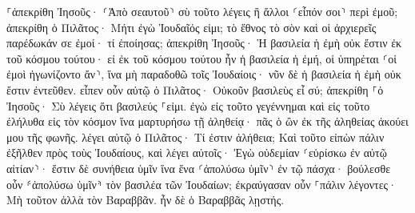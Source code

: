 \documentclass{openreader}
\begin{document}
⸀ἀπεκρίθη Ἰησοῦς· ⸂Ἀπὸ σεαυτοῦ⸃ σὺ τοῦτο λέγεις ἢ ἄλλοι ⸂εἶπόν σοι⸃ περὶ ἐμοῦ; 
ἀπεκρίθη ὁ Πιλᾶτος· Μήτι ἐγὼ Ἰουδαῖός εἰμι; τὸ ἔθνος τὸ σὸν καὶ οἱ ἀρχιερεῖς παρέδωκάν σε ἐμοί· τί ἐποίησας; 
ἀπεκρίθη Ἰησοῦς· Ἡ βασιλεία ἡ ἐμὴ οὐκ ἔστιν ἐκ τοῦ κόσμου τούτου· εἰ ἐκ τοῦ κόσμου τούτου ἦν ἡ βασιλεία ἡ ἐμή, οἱ ὑπηρέται ⸂οἱ ἐμοὶ ἠγωνίζοντο ἄν⸃, ἵνα μὴ παραδοθῶ τοῖς Ἰουδαίοις· νῦν δὲ ἡ βασιλεία ἡ ἐμὴ οὐκ ἔστιν ἐντεῦθεν. 
εἶπεν οὖν αὐτῷ ὁ Πιλᾶτος· Οὐκοῦν βασιλεὺς εἶ σύ; ἀπεκρίθη ⸀ὁ Ἰησοῦς· Σὺ λέγεις ὅτι βασιλεύς ⸀εἰμι. ἐγὼ εἰς τοῦτο γεγέννημαι καὶ εἰς τοῦτο ἐλήλυθα εἰς τὸν κόσμον ἵνα μαρτυρήσω τῇ ἀληθείᾳ· πᾶς ὁ ὢν ἐκ τῆς ἀληθείας ἀκούει μου τῆς φωνῆς. 
λέγει αὐτῷ ὁ Πιλᾶτος· Τί ἐστιν ἀλήθεια; Καὶ τοῦτο εἰπὼν πάλιν ἐξῆλθεν πρὸς τοὺς Ἰουδαίους, καὶ λέγει αὐτοῖς· Ἐγὼ οὐδεμίαν ⸂εὑρίσκω ἐν αὐτῷ αἰτίαν⸃· 
ἔστιν δὲ συνήθεια ὑμῖν ἵνα ἕνα ⸂ἀπολύσω ὑμῖν⸃ ἐν τῷ πάσχα· βούλεσθε οὖν ⸄ἀπολύσω ὑμῖν⸅ τὸν βασιλέα τῶν Ἰουδαίων; 
ἐκραύγασαν οὖν ⸀πάλιν λέγοντες· Μὴ τοῦτον ἀλλὰ τὸν Βαραββᾶν. ἦν δὲ ὁ Βαραββᾶς λῃστής. 
\end{document}
